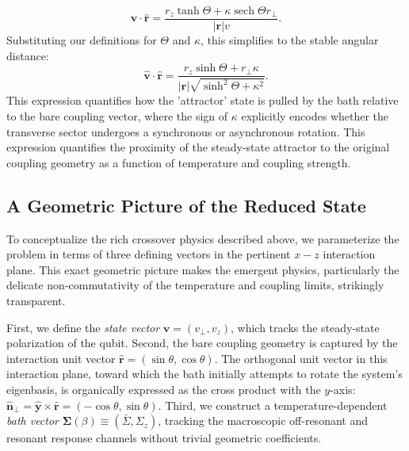 \begin{equation}
    \hat{\boldsymbol{v}} \cdot \hat{\boldsymbol{r}} = \frac{r_z \tanh\Theta + \kappa \operatorname{sech}\Theta r_\perp}{|\boldsymbol{r}| v}.
\end{equation}
Substituting our definitions for $\Theta$ and $\kappa$, this simplifies to the stable angular distance:
\begin{equation}
    \hat{\boldsymbol{v}} \cdot \hat{\boldsymbol{r}} = \frac{r_z \sinh\Theta + r_\perp \kappa}{|\boldsymbol{r}| \sqrt{\sinh^2\Theta + \kappa^2}}.
\end{equation}
This expression quantifies how the 'attractor' state is pulled by the bath relative to the bare coupling vector, where the sign of $\kappa$ explicitly encodes whether the transverse sector undergoes a synchronous or asynchronous rotation.
This expression quantifies the proximity of the steady-state attractor to the original coupling geometry as a function of temperature and coupling strength.

\subsection{A Geometric Picture of the Reduced State}

To conceptualize the rich crossover physics described above, we parameterize the problem in terms of three defining vectors in the pertinent $x-z$ interaction plane. This exact geometric picture makes the emergent physics, particularly the delicate non-commutativity of the temperature and coupling limits, strikingly transparent. 

First, we define the \emph{state vector} $\boldsymbol{v} = (v_\perp, v_z)$, which tracks the steady-state polarization of the qubit. 
Second, the bare coupling geometry is captured by the interaction unit vector $\hat{\boldsymbol{r}} = (\sin\theta, \cos\theta)$. The orthogonal unit vector in this interaction plane, toward which the bath initially attempts to rotate the system's eigenbasis, is organically expressed as the cross product with the $y$-axis: $\hat{\boldsymbol{n}}_\perp = \hat{\boldsymbol{y}} \times \hat{\boldsymbol{r}} = (-\cos\theta, \sin\theta)$.
Third, we construct a temperature-dependent \emph{bath vector} $\boldsymbol{\Sigma}(\beta) \equiv (\bar{\Sigma}, \Sigma_z)$, tracking the macroscopic off-resonant and resonant response channels without trivial geometric coefficients.

